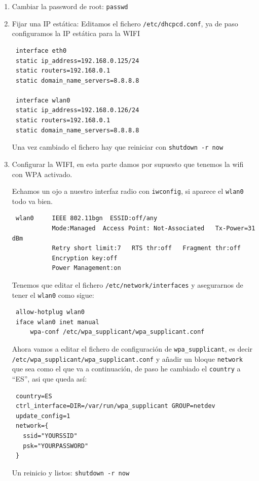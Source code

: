 \documentclass[12pt,spanish,]{scrartcl}
\begin{document}
\begin{enumerate}
\def\labelenumi{\arabic{enumi}.}
\item
  Cambiar la password de root: \texttt{passwd}
\item
  Fijar una IP estática: Editamos el fichero \texttt{/etc/dhcpcd.conf},
  ya de paso configuramos la IP estática para la WIFI

\begin{verbatim}
 interface eth0
 static ip_address=192.168.0.125/24
 static routers=192.168.0.1
 static domain_name_servers=8.8.8.8

 interface wlan0
 static ip_address=192.168.0.126/24
 static routers=192.168.0.1
 static domain_name_servers=8.8.8.8
\end{verbatim}

  Una vez cambiado el fichero hay que reiniciar con
  \texttt{shutdown\ -r\ now}
\item
  Configurar la WIFI, en esta parte damos por supuesto que tenemos la
  wifi con WPA activado.

  Echamos un ojo a nuestro interfaz radio con \texttt{iwconfig}, si
  aparece el \texttt{wlan0} todo va bien.

\begin{verbatim}
 wlan0     IEEE 802.11bgn  ESSID:off/any
           Mode:Managed  Access Point: Not-Associated   Tx-Power=31 dBm
           Retry short limit:7   RTS thr:off   Fragment thr:off
           Encryption key:off
           Power Management:on
\end{verbatim}

  Tenemos que editar el fichero \texttt{/etc/network/interfaces} y
  asegurarnos de tener el \texttt{wlan0} como sigue:

\begin{verbatim}
 allow-hotplug wlan0
 iface wlan0 inet manual
     wpa-conf /etc/wpa_supplicant/wpa_supplicant.conf
\end{verbatim}

  Ahora vamos a editar el fichero de configuración de
  \texttt{wpa\_supplicant}, es decir
  \texttt{/etc/wpa\_supplicant/wpa\_supplicant.conf} y añadir un bloque
  \texttt{network} que sea como el que va a continuación, de paso he
  cambiado el \texttt{country} a ``ES'', asi que queda así:

\begin{verbatim}
 country=ES
 ctrl_interface=DIR=/var/run/wpa_supplicant GROUP=netdev
 update_config=1
 network={
   ssid="YOURSSID"
   psk="YOURPASSWORD"
 }
\end{verbatim}

  Un reinicio y listos: \texttt{shutdown\ -r\ now}
\end{enumerate}
\end{document}
